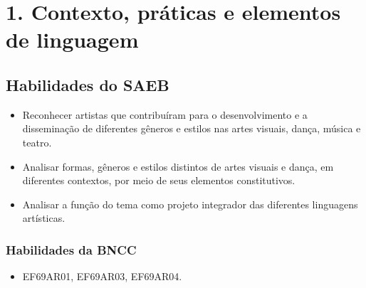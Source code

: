 \chapter{1. Contexto, práticas e elementos de linguagem}

\section{Habilidades do SAEB}

\begin{itemize}
  \item Reconhecer artistas que contribuíram para o desenvolvimento e a disseminação de diferentes gêneros 
  e estilos nas artes visuais, dança, música e teatro.
  \item Analisar formas, gêneros e estilos distintos de artes visuais e dança, em diferentes contextos, por 
  meio de seus elementos constitutivos.
  \item Analisar a função do tema como projeto integrador das diferentes linguagens artísticas.
\end{itemize}

\subsection{Habilidades da BNCC}

\begin{itemize}
  \item EF69AR01, EF69AR03, EF69AR04.
\end{itemize}


